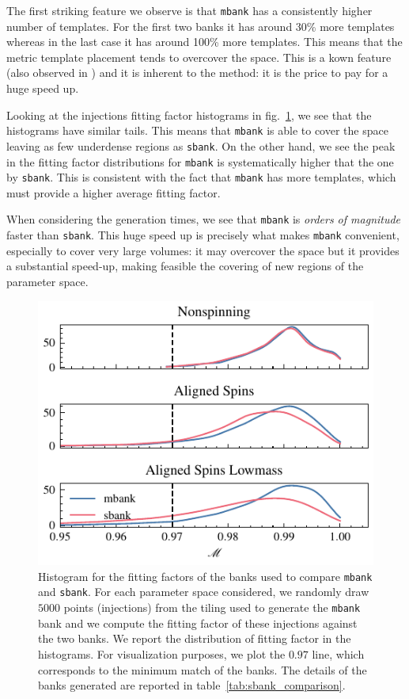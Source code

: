 \documentclass[twocolumn,showpacs,preprintnumbers,nofootinbib,prd,
superscriptaddress,10pt]{revtex4-2}
\newcommand{\mbank}{\texttt{mbank} }
\begin{document}
The first striking feature we observe is that \mbank has a consistently higher number of templates. For the first two banks it has around 30\% more templates whereas in the last case it has around 100\% more templates. This means that the metric template placement tends to overcover the space. This is a kown feature (also observed in \cite{}) and it is inherent to the method: it is the price to pay for a huge speed up.

Looking at the injections fitting factor histograms in fig.~\ref{fig:sbank_comparison}, we see that the histograms have similar tails. This means that \mbank is able to cover the space leaving as few underdense regions as \texttt{sbank}. On the other hand, we see the peak in the fitting factor distributions for \mbank is systematically higher that the one by \texttt{sbank}. This is consistent with the fact that \mbank has more templates, which must provide a higher average fitting factor.

When considering the generation times, we see that \mbank is {\it orders of magnitude} faster than \texttt{sbank}. This huge speed up is precisely what makes \mbank convenient, especially to cover very large volumes: it may overcover the space but it provides a substantial speed-up, making feasible the covering of new regions of the parameter space.

\begin{figure}[t]
	\includegraphics{sbank_comparison}
	\caption{Histogram for the fitting factors of the banks used to compare \mbank and \texttt{sbank}. For each parameter space considered, we randomly draw $5000$ points (injections) from the tiling used to generate the \mbank bank and we compute the fitting factor of these injections against the two banks. We report the distribution of fitting factor in the histograms. For visualization purposes, we plot the $0.97$ line, which corresponds to the minimum match of the banks.
	The details of the banks generated are reported in table~\ref{tab:sbank_comparison}.
	}
	\label{fig:sbank_comparison}
\end{figure}
\end{document}
